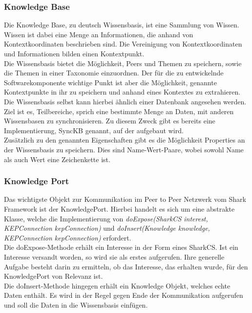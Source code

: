 \documentclass[a4paper]{article}
\begin{document}
	\subsubsection{Knowledge Base} 
	Die Knowledge Base, zu deutsch Wissensbasis, ist eine Sammlung von Wissen.
	Wissen ist dabei eine Menge an Informationen, die anhand von
	Kontextkoordinaten beschrieben sind. Die Vereinigung von Kontextkoordinaten
	und Informationen bilden einen Kontextpunkt.\\
	
	Die Wissensbasis bietet die Möglichkeit, Peers und Themen zu speichern, sowie
	die Themen in einer Taxonomie einzuordnen. Der für die zu entwickelnde
	Softwarekomponente wichtige Punkt ist aber die Möglichkeit, genannte
	Kontextpunkte in ihr zu speichern und anhand eines Kontextes zu extrahieren.
	Die Wissensbasis selbst kann hierbei ähnlich einer Datenbank angesehen werden.
	Ziel ist es, Teilbereiche, sprich eine bestimmte Menge an Daten, mit
	anderen Wissensbasen zu synchronisieren. Zu diesem Zweck gibt es bereits eine
	Implementierung, SyncKB genannt, auf der aufgebaut wird. \\
	
	Zusätzlich zu den genannten Eigenschaften gibt es die Möglichkeit Properties
	an der Wissensbasis zu speichern. Dies sind Name-Wert-Paare, wobei sowohl Name 
	als auch Wert eine Zeichenkette ist.
	
	\subsubsection{Knowledge Port} 
	Das wichtigste Objekt zur Kommunikation im Peer to Peer Netzwerk vom Shark
	Framework ist der KnowledgePort. Hierbei handelt es  sich um eine abstrakte
	Klasse,	welche die Implementierung von \emph{doExpose(SharkCS interest,
	KEPConnection kepConnection)} und \emph{doInsert(Knowledge knowledge,
	KEPConnection kepConnection)} erfordert. \\
	
	Die doExpose-Methode erhält ein Interesse in der Form eines SharkCS. Ist
	ein Interesse versandt worden, so wird sie als erstes aufgerufen. Ihre 
	generelle Aufgabe besteht darin zu ermitteln, ob das Interesse, das erhalten
	wurde, für den KnowledgePort von Relevanz ist. \\
	
	Die doInsert-Methode hingegen erhält ein Knowledge Objekt, welches echte
	Daten enthält. Es wird in der Regel gegen Ende der Kommunikation aufgerufen
	und soll die Daten in die Wissensbasis einfügen. \\
	
\end{document}
